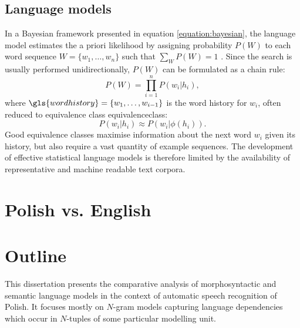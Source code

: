 \subsection{Language models}
\label{subsection:lm}
 In a Bayesian framework presented in equation \ref{equation:bayesian}, the language model estimates the a priori likelihood by assigning probability $P(W)$ to each word sequence $W=\{w_{1}, \ldots, w_{n}\}$ such that $\sum_{W}P(W)=1$ \cite{rosenfeld2000two}. Since the search is usually performed unidirectionally, $P(W)$ can be formulated as a chain rule:
\begin{equation}
  P(W)=\prod^{n}_{i=1}P(w_{i}|h_{i}),
\end{equation}
where $\gls{wordhistory}=\{w_{1}, \ldots, w_{i-1}\}$ is the word history for $w_{i}$, often reduced to equivalence class \gls{equivalenceclass}:
\begin{equation}
  P(w_{i}|h_{i})\approx P(w_{i}|\phi(h_{i})).
\end{equation}
Good equivalence classes maximise information about the next word $w_{i}$ given its history, but also require a vast quantity of example sequences. The development of effective statistical language models is therefore limited by the availability of representative and machine readable text corpora.

\section{Polish vs. English}
\label{section:polish}

\section{Outline}
\label{section:outline}
This dissertation presents the comparative analysis of morphosyntactic and semantic language models in the context of automatic speech recognition of Polish. It focuses mostly on $N$-gram models capturing language dependencies which occur in $N$-tuples of some particular modelling unit.
